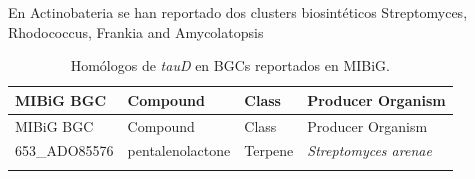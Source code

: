 \documentclass[12pt,twoside]{reedthesis}
\begin{document}
  En Actinobateria se han reportado dos clusters biosintéticos
  Streptomyces, Rhodococcus, Frankia and Amycolatopsis
  
  \begin{longtable}[]{@{}llll@{}}
  \caption{Homólogos de \emph{tauD} en BGCs reportados en
  MIBiG.\label{tab:tauD}}\tabularnewline
  \toprule
  \begin{minipage}[b]{0.19\columnwidth}\raggedright\strut
  MIBiG BGC\strut
  \end{minipage} & \begin{minipage}[b]{0.20\columnwidth}\raggedright\strut
  Compound\strut
  \end{minipage} & \begin{minipage}[b]{0.15\columnwidth}\raggedright\strut
  Class\strut
  \end{minipage} & \begin{minipage}[b]{0.34\columnwidth}\raggedright\strut
  Producer Organism\strut
  \end{minipage}\tabularnewline
  \midrule
  \endfirsthead
  \toprule
  \begin{minipage}[b]{0.19\columnwidth}\raggedright\strut
  MIBiG BGC\strut
  \end{minipage} & \begin{minipage}[b]{0.20\columnwidth}\raggedright\strut
  Compound\strut
  \end{minipage} & \begin{minipage}[b]{0.15\columnwidth}\raggedright\strut
  Class\strut
  \end{minipage} & \begin{minipage}[b]{0.34\columnwidth}\raggedright\strut
  Producer Organism\strut
  \end{minipage}\tabularnewline
  \midrule
  \endhead
  \begin{minipage}[t]{0.19\columnwidth}\raggedright\strut
  653\_ADO85576\strut
  \end{minipage} & \begin{minipage}[t]{0.20\columnwidth}\raggedright\strut
  pentalenolactone\strut
  \end{minipage} & \begin{minipage}[t]{0.15\columnwidth}\raggedright\strut
  Terpene\strut
  \end{minipage} & \begin{minipage}[t]{0.34\columnwidth}\raggedright\strut
  \emph{Streptomyces arenae}\strut
  \end{minipage}\tabularnewline
  \begin{minipage}[t]{0.19\columnwidth}\raggedright\strut

\end{minipage}
\end{longtable}
\end{document}

